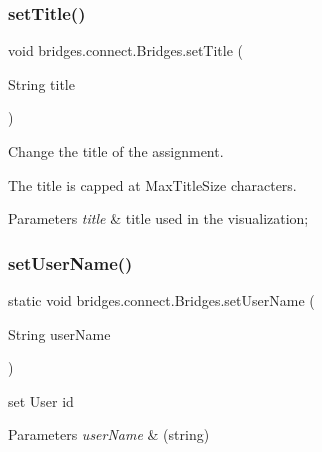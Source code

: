\subsubsection{\texorpdfstring{set\+Title()}{setTitle()}}
{\footnotesize\ttfamily void bridges.\+connect.\+Bridges.\+set\+Title (\begin{DoxyParamCaption}\item[{String}]{title }\end{DoxyParamCaption})}



Change the title of the assignment. 

The title is capped at Max\+Title\+Size characters.


\begin{DoxyParams}{Parameters}
{\em title} & title used in the visualization; \\
\hline
\end{DoxyParams}
\mbox{\label{classbridges_1_1connect_1_1_bridges_af9b9a2ca03ba02c0c2be4716594678a6}} 
\subsubsection{\texorpdfstring{set\+User\+Name()}{setUserName()}}
{\footnotesize\ttfamily static void bridges.\+connect.\+Bridges.\+set\+User\+Name (\begin{DoxyParamCaption}\item[{String}]{user\+Name }\end{DoxyParamCaption})\hspace{0.3cm}{\ttfamily [static]}}

set User id


\begin{DoxyParams}{Parameters}
{\em user\+Name} & (string) \\
\hline
\end{DoxyParams}
\mbox{\label{classbridges_1_1connect_1_1_bridges_aa502aa32a9ac482da9c8455c6810b64d}} 
